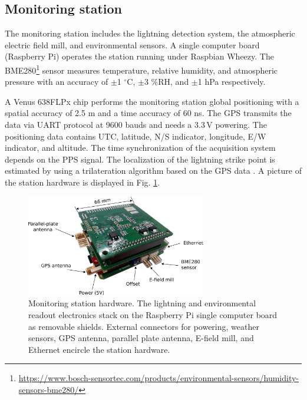 \documentclass[letterpaper,12pt]{article}
\begin{document}
\subsection{Monitoring station}

The monitoring station includes the lightning detection system, the atmospheric electric field mill, and environmental sensors. A single computer board (Raspberry Pi) operates the station running under Raspbian Wheezy. The BME280\footnote{\url{https://www.bosch-sensortec.com/products/environmental-sensors/humidity-sensors-bme280/}} sensor measures temperature, relative humidity, and atmospheric pressure with an accuracy of $\pm$1 $^{\circ}$C, $\pm$3 $\%$RH, and $\pm$1 hPa respectively. 

A Venus 638FLPx chip performs the monitoring station global positioning with a spatial accuracy of 2.5 m and a time accuracy of 60 ns. The GPS transmits the data via UART protocol at 9600 bauds and needs a 3.3\,V powering. The positioning data contains UTC, latitude, N/S indicator, longitude, E/W indicator, and altitude. The time synchronization of the acquisition system depends on the PPS signal. The localization of the lightning strike point is estimated by using a trilateration algorithm based on the GPS data \cite{MialdeaFlor2019}. A picture of the station hardware is displayed in Fig. \ref{fig::station}.


\begin{figure}[h!]
\begin{center}
\includegraphics[width=0.7\textwidth]{Figures/Station.eps}
\caption{Monitoring station hardware.  The lightning and environmental readout electronics stack on the Raspberry Pi single computer board as removable shields. External connectors for powering, weather sensors, GPS antenna, parallel plate antenna, E-field mill, and Ethernet encircle the station hardware.}
\label{fig::station}
\end{center}
\end{figure}
\end{document}
